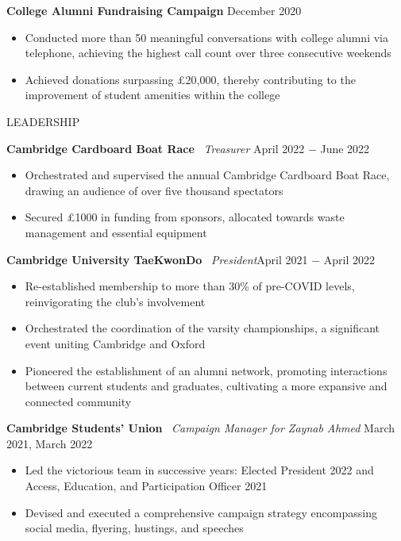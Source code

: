 \documentclass{article}
\begin{document}
\textbf{College Alumni Fundraising Campaign} \hfill December 2020
\begin{itemize}
    \item Conducted more than 50 meaningful conversations with college alumni via telephone, achieving the highest call count over three consecutive weekends
    \item Achieved donations surpassing £20,000, thereby contributing to the improvement of student amenities within the college
\end{itemize} \medskip

\uppercase{Leadership}

\textbf{Cambridge Cardboard Boat Race} \
\textit{Treasurer} \hfill April 2022 $-$ June 2022
\begin{itemize}
    \item Orchestrated and supervised the annual Cambridge Cardboard Boat Race, drawing an audience of over five thousand spectators
    \item Secured £1000 in funding from sponsors, allocated towards waste management and essential equipment
\end{itemize} \medskip

\textbf{Cambridge University TaeKwonDo} \
\textit{President}\hfill April 2021 $-$ April 2022
\begin{itemize}
    \item Re-established membership to more than 30\% of pre-COVID levels, reinvigorating the club's involvement
    \item Orchestrated the coordination of the varsity championships, a significant event uniting Cambridge and Oxford
    \item Pioneered the establishment of an alumni network, promoting interactions between current students and graduates, cultivating a more expansive and connected community
\end{itemize} \medskip

\textbf{Cambridge Students' Union} \
\textit{Campaign Manager for Zaynab Ahmed} \hfill March 2021, March 2022
\begin{itemize}
    \item Led the victorious team in successive years: Elected President 2022 and Access, Education, and Participation Officer 2021
    \item Devised and executed a comprehensive campaign strategy encompassing social media, flyering, hustings, and speeches
\end{itemize} \medskip
\end{document}
